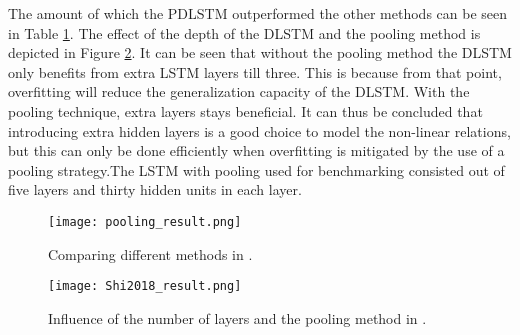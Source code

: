 The amount of which the PDLSTM outperformed the other methods can be seen in Table \ref{tab:pooling_result}. The effect of the depth of the DLSTM and the pooling method is depicted in Figure \ref{fig:Shi2018_result}. It can be seen that without the pooling method the DLSTM only benefits from extra LSTM layers till three. This is because from that point, overfitting will reduce the generalization capacity of the DLSTM. With the pooling technique, extra layers stays beneficial. It can thus be concluded that introducing extra hidden layers is a good choice to model the non-linear relations, but this can only be done efficiently when overfitting is mitigated by the use of a pooling strategy.The LSTM with pooling used for benchmarking consisted out of five layers and thirty hidden units in each layer.\\

\begin{figure}[h!]
	\centering
	\texttt{[image: pooling\_result.png]}
	\caption{Comparing different methods in \cite{Shi2018}.}
	\label{tab:pooling_result}
\end{figure}

\begin{figure}[h!]
	\centering
	\texttt{[image: Shi2018\_result.png]}
	\caption{Influence of the number of layers and the pooling method in \cite{Shi2018}.}
	\label{fig:Shi2018_result}
\end{figure}



